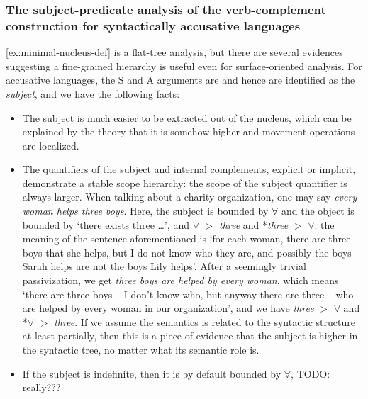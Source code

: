 \documentclass{article}
\newcommand*{\term}[1]{\emph{#1}}
\newcommand*{\corpus}[1]{\emph{#1}}
\begin{document}
\subsubsection{The subject-predicate analysis of the verb-complement construction for syntactically accusative languages}

\eqref{ex:minimal-nucleus-def} is a flat-tree analysis, 
but there are several evidences suggesting 
a fine-grained hierarchy is useful even for surface-oriented analysis.
For accusative languages, 
the S and A arguments are and hence are identified as the \term{subject}, 
and we have the following facts:
\begin{itemize}
    \item The subject is much easier to be extracted out of the nucleus,
    which can be explained by the theory that 
    it is somehow higher and movement operations are localized.
    \item The quantifiers of the subject and internal complements, 
    explicit or implicit, 
    demonstrate a stable scope hierarchy:
    the scope of the subject quantifier is always larger.
    When talking about a charity organization,
    one may say \corpus{every woman helps three boys}.
    Here, the subject is bounded by $\forall$ and the object is bounded by `there exists three \dots',
    and $\forall$ $>$ \corpus{three} and *\corpus{three} $>$ $\forall$:
    the meaning of the sentence aforementioned is 
    `for each woman, there are three boys that she helps,
    but I do not know who they are,
    and possibly the boys Sarah helps are not the boys Lily helps'.
    After a seemingly trivial passivization, 
    we get \corpus{three boys are helped by every woman},
    which means 
    `there are three boys -- I don't know who, but anyway there are three -- 
    who are helped by every woman in our organization',
    and we have \corpus{three} $>$ $\forall$ and *$\forall$ $>$ \corpus{three}.
    If we assume the semantics is related to the syntactic structure at least partially,
    then this is a piece of evidence that the subject is higher in the syntactic tree,
    no matter what its semantic role is. 
    \item If the subject is indefinite, then it is by default bounded by $\forall$, TODO: really???
    

\end{itemize}
\end{document}
